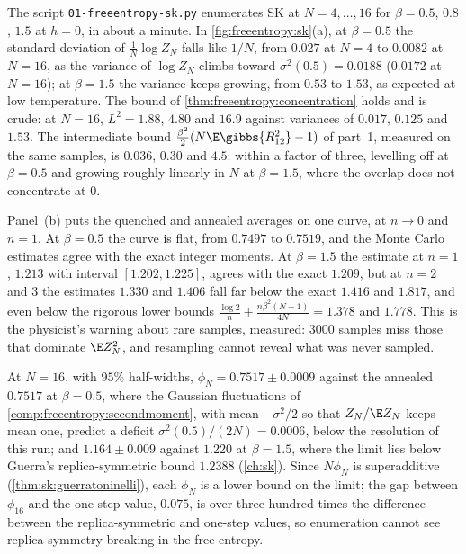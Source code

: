 \begin{refsection}
The script \texttt{01-freeentropy-sk.py} enumerates SK at $N=4,\dots,16$ for $\beta=0.5$, $0.8$, $1.5$ at $h=0$, in about a minute. In \cref{fig:freeentropy:sk}(a), at $\beta=0.5$ the standard deviation of $\frac1N\log Z_N$ falls like $1/N$, from $0.027$ at $N=4$ to $0.0082$ at $N=16$, as the variance of $\log Z_N$ climbs toward $\sigma^2(0.5)=0.0188$ ($0.0172$ at $N=16$); at $\beta=1.5$ the variance keeps growing, from $0.53$ to $1.53$, as expected at low temperature. The bound of \cref{thm:freeentropy:concentration} holds and is crude: at $N=16$, $L^2=1.88$, $4.80$ and $16.9$ against variances of $0.017$, $0.125$ and $1.53$. The intermediate bound $\frac{\beta^2}2(N\E\gibbs{R_{12}^2}-1)$ of part~1, measured on the same samples, is $0.036$, $0.30$ and $4.5$: within a factor of three, levelling off at $\beta=0.5$ and growing roughly linearly in $N$ at $\beta=1.5$, where the overlap does not concentrate at $0$.

Panel~(b) puts the quenched and annealed averages on one curve, at $n\to0$ and $n=1$. At $\beta=0.5$ the curve is flat, from $0.7497$ to $0.7519$, and the Monte Carlo estimates agree with the exact integer moments. At $\beta=1.5$ the estimate at $n=1$, $1.213$ with interval $[1.202,1.225]$, agrees with the exact $1.209$, but at $n=2$ and $3$ the estimates $1.330$ and $1.406$ fall far below the exact $1.416$ and $1.817$, and even below the rigorous lower bounds $\frac{\log2}n+\frac{n\beta^2(N-1)}{4N}=1.378$ and $1.778$. This is the physicist's warning about rare samples, measured: $3000$ samples miss those that dominate $\E Z_N^2$, and resampling cannot reveal what was never sampled.

At $N=16$, with $95\%$ half-widths, $\phi_N=0.7517\pm0.0009$ against the annealed $0.7517$ at $\beta=0.5$, where the Gaussian fluctuations of \cref{comp:freeentropy:secondmoment}, with mean $-\sigma^2/2$ so that $Z_N/\E Z_N$ keeps mean one, predict a deficit $\sigma^2(0.5)/(2N)=0.0006$, below the resolution of this run; and $1.164\pm0.009$ against $1.220$ at $\beta=1.5$, where the limit lies below Guerra's replica-symmetric bound $1.2388$ (\cref{ch:sk}). Since $N\phi_N$ is superadditive (\cref{thm:sk:guerratoninelli}), each $\phi_N$ is a lower bound on the limit; the gap between $\phi_{16}$ and the one-step value, $0.075$, is over three hundred times the difference between the replica-symmetric and one-step values, so enumeration cannot see replica symmetry breaking in the free entropy.


\end{refsection}
